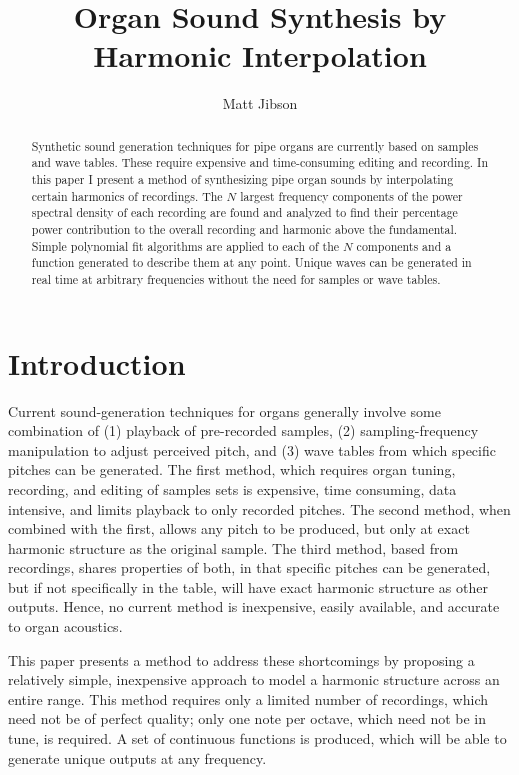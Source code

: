 \documentclass[twocolumn]{article}
\begin{document}
\title{Organ Sound Synthesis by Harmonic Interpolation}
\author{Matt Jibson}

\maketitle{}

\begin{abstract}

Synthetic sound generation techniques for pipe organs are currently based on samples and wave tables. These require expensive and time-consuming editing and recording. In this paper I present a method of synthesizing pipe organ sounds by interpolating certain harmonics of recordings. The $N$ largest frequency components of the power spectral density of each recording are found and analyzed to find their percentage power contribution to the overall recording and harmonic above the fundamental. Simple polynomial fit algorithms are applied to each of the $N$ components and a function generated to describe them at any point. Unique waves can be generated in real time at arbitrary frequencies without the need for samples or wave tables.

\end{abstract}

\section{Introduction}

Current sound-generation techniques for organs generally involve some combination of (1) playback of pre-recorded samples, (2) sampling-frequency manipulation to adjust perceived pitch, and (3) wave tables from which specific pitches can be generated. The first method, which requires organ tuning, recording, and editing of samples sets is expensive, time consuming, data intensive, and limits playback to only recorded pitches. The second method, when combined with the first, allows any pitch to be produced, but only at exact harmonic structure as the original sample. The third method, based from recordings, shares properties of both, in that specific pitches can be generated, but if not specifically in the table, will have exact harmonic structure as other outputs. Hence, no current method is inexpensive, easily available, and accurate to organ acoustics.

This paper presents a method to address these shortcomings by proposing a relatively simple, inexpensive approach to model a harmonic structure across an entire range. This method requires only a limited number of recordings, which need not be of perfect quality; only one note per octave, which need not be in tune, is required. A set of continuous functions is produced, which will be able to generate unique outputs at any frequency.
\end{document}
